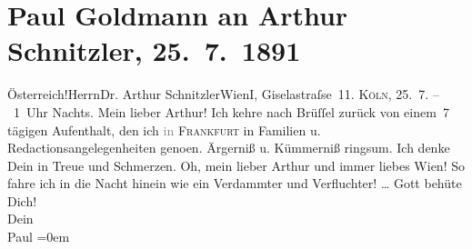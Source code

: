 

         \renewcommand{\erwaehnteOrte}{Orte: Brüssel, Bösendorferstraße, Frankfurt am Main, I., Innere Stadt, Köln, Wien, Österreich}
         \renewcommand{\erwaehnteWerke}{}
               \section[Paul Goldmann an Arthur Schnitzler, 25. 7. 1891]{ Paul Goldmann an Arthur Schnitzler, 25. 7. 1891}\nopagebreak{}\rehead{ }\begin{ledgroupsized}[t]{13cm}\normalsize\beginnumbering \toendnotes[C]{\smallbreak\pagebreak[2]} 
\toendnotes[C]{\smallbreak}\pstart{}{\pb}Österreich!\pend{}\pstart{}Herrn\pend{}\pstart{}Dr. Arthur Schnitzler\pend{}\pstart{}Wien\pend{}\pstart{}I, Giselastraſse 11.\pend{}{\bigskip}\pstart
           \noindent{}{\pb}\textsc{Köln}, 25. 7. – 1 Uhr Nachts. Mein lieber Arthur! Ich kehre nach Brüſſel zurück von einem 7 tägigen Aufenthalt, den ich
                  \textcolor{gray}{in}{ }\textsc{Frankfurt} in Familien u. Redactionsangelegenheiten geno{\geminationm}en.
               Ärgerniß u. Kümmerniß ringsum. Ich denke Dein in Treue und Schmerzen. Oh, mein lieber
               Arthur und immer liebes Wien! So fahre ich in die
               Nacht hinein wie ein Verdammter und Verfluchter! {\dots}\pend
           \pstart
           Gott behüte Dich!{\\[\baselineskip]}Dein {\\[\baselineskip]}\spacefill\mbox{Paul}\pend
           \leftskip=0em{}\pstart
           \noindent{}\label{T_L02667-1v}\label{T_L02667-1h}\pend
           
         
         \endnumbering{}\end{ledgroupsized}  \newcommand{\dateiname}{L02667}\newcommand{\titel}{Paul Goldmann an Arthur Schnitzler, 25. 7. 1891}\newcommand{\editorInnen}{Martin Anton Müller und Laura Untner}
      